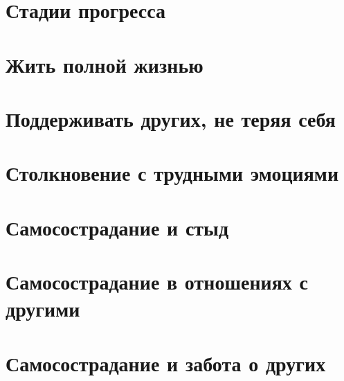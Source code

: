 \documentclass[a4paper,12pt]{report}
\begin{document}



\tableofcontents

















\chapter{Стадии прогресса}
\chapter{Жить полной жизнью}
\chapter{Поддерживать других, не теряя себя}
\chapter{Столкновение с трудными эмоциями}
\chapter{Самосострадание и стыд}
\chapter{Самосострадание в отношениях с другими}
\chapter{Самосострадание и забота о других}
\end{document}
